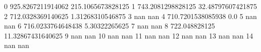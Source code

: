 0 925.8267211914062 215.1065673828125
1 743.2081298828125 32.48797607421875
2 712.0328369140625 1.31268310546875
3 nan nan
4 710.7201538085938 0.0
5 nan nan
6 716.0233764648438 5.30322265625
7 nan nan
8 722.048828125 11.32867431640625
9 nan nan
10 nan nan
11 nan nan
12 nan nan
13 nan nan
14 nan nan
